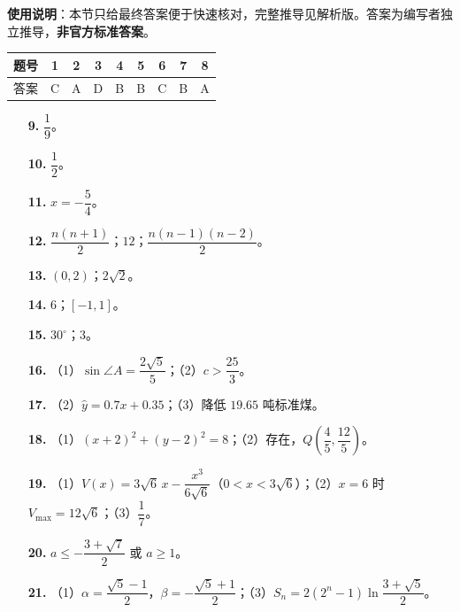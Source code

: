 
\begin{gknotice}
\textbf{使用说明}：本节只给最终答案便于快速核对，完整推导见解析版。答案为编写者独立推导，\textbf{非官方标准答案}。
\end{gknotice}

\begin{center}\begin{tabular}{ccccccccc}
\toprule
题号 & 1 & 2 & 3 & 4 & 5 & 6 & 7 & 8 \\
\midrule
答案 & C & A & D & B & B & C & B & A \\
\bottomrule
\end{tabular}\end{center}

\begin{itemize}[leftmargin=2.6em]
  \item[\textbf{9.}] $\dfrac19$。
  \item[\textbf{10.}] $\dfrac12$。
  \item[\textbf{11.}] $x=-\dfrac54$。
  \item[\textbf{12.}] $\dfrac{n(n+1)}{2}$；$12$；$\dfrac{n(n-1)(n-2)}{2}$。
  \item[\textbf{13.}] $(0,2)$；$2\sqrt2$。
  \item[\textbf{14.}] $6$；$[-1,1]$。
  \item[\textbf{15.}] $30^\circ$；$3$。
\end{itemize}

\begin{itemize}[leftmargin=2.6em]
  \item[\textbf{16.}] （1）$\sin\angle A=\dfrac{2\sqrt5}{5}$；（2）$c>\dfrac{25}{3}$。
  \item[\textbf{17.}] （2）$\hat y=0.7x+0.35$；（3）降低 $19.65$ 吨标准煤。
  \item[\textbf{18.}] （1）$(x+2)^2+(y-2)^2=8$；（2）存在，$Q\left(\dfrac45,\dfrac{12}{5}\right)$。
  \item[\textbf{19.}] （1）$V(x)=3\sqrt6\,x-\dfrac{x^3}{6\sqrt6}$（$0<x<3\sqrt6$）；（2）$x=6$ 时 $V_{\max}=12\sqrt6$；（3）$\dfrac17$。
  \item[\textbf{20.}] $a\leqslant-\dfrac{3+\sqrt7}{2}$ 或 $a\geqslant1$。
  \item[\textbf{21.}] （1）$\alpha=\dfrac{\sqrt5-1}{2}$，$\beta=-\dfrac{\sqrt5+1}{2}$；（3）$S_n=2(2^n-1)\ln\dfrac{3+\sqrt5}{2}$。
\end{itemize}
